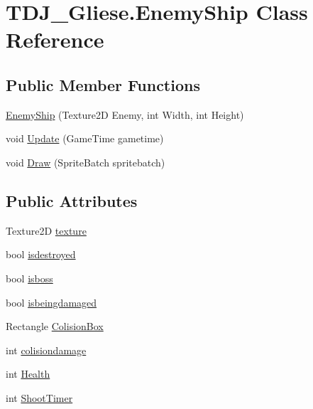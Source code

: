 \hypertarget{class_t_d_j___gliese_1_1_enemy_ship}{}\section{T\+D\+J\+\_\+\+Gliese.\+Enemy\+Ship Class Reference}
\label{class_t_d_j___gliese_1_1_enemy_ship}
\subsection*{Public Member Functions}
\begin{DoxyCompactItemize}
\item 
\hyperlink{class_t_d_j___gliese_1_1_enemy_ship_a1ad4b6c4e8cdf0fdb7fec1e1587d6784}{Enemy\+Ship} (Texture2D Enemy, int Width, int Height)
\item 
void \hyperlink{class_t_d_j___gliese_1_1_enemy_ship_ae1f6a24b42395397c0c475de87ce81a0}{Update} (Game\+Time gametime)
\item 
void \hyperlink{class_t_d_j___gliese_1_1_enemy_ship_ace0faaa2d1141ec35b3e547319bc9b49}{Draw} (Sprite\+Batch spritebatch)
\end{DoxyCompactItemize}
\subsection*{Public Attributes}
\begin{DoxyCompactItemize}
\item 
Texture2D \hyperlink{class_t_d_j___gliese_1_1_enemy_ship_abe9d9143fb6cae02801564abc684f0bd}{texture}
\item 
bool \hyperlink{class_t_d_j___gliese_1_1_enemy_ship_ad4bb9eae4d0c37a7dc63c4481a8aca83}{isdestroyed}
\item 
bool \hyperlink{class_t_d_j___gliese_1_1_enemy_ship_a9442f7ae3136a7d96683623291777b9c}{isboss}
\item 
bool \hyperlink{class_t_d_j___gliese_1_1_enemy_ship_a14aa2946d38f0786ca9b800e3ad16478}{isbeingdamaged}
\item 
Rectangle \hyperlink{class_t_d_j___gliese_1_1_enemy_ship_af416bbfe5554a5975f8ec04cc795d3f6}{Colision\+Box}
\item 
int \hyperlink{class_t_d_j___gliese_1_1_enemy_ship_ab3db4f3a7761cf493ddce51d9d81e4d5}{colisiondamage}
\item 
int \hyperlink{class_t_d_j___gliese_1_1_enemy_ship_a4dc1b91ae6e1cffd281eba0bd8ccc0d1}{Health}
\item 
int \hyperlink{class_t_d_j___gliese_1_1_enemy_ship_a52cc56b6adf370c5ec1931ad8adbf8d0}{Shoot\+Timer}
\end{DoxyCompactItemize}


